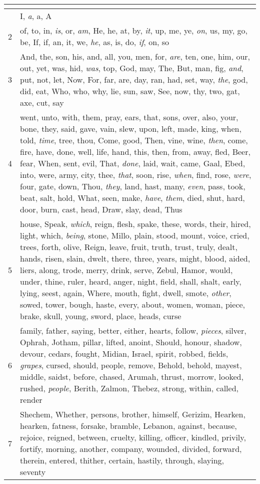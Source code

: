 \begin{center}
\begin{longtable}{l|p{3.75in}}
\hline \multicolumn{2}{c}{{ }} \\ \hline
\endfoot 
1 & I, \emph{a}, a, A\\ \hline 
2 & of, to, in, \emph{is}, or, \emph{am}, He, he, at, by, \emph{it}, up, me, ye, \emph{on}, us, my, go, be, If, if, an, it, we, \emph{he}, as, is, do, \emph{if}, on, so\\ \hline 
3 & And, the, son, his, and, all, you, men, for, \emph{are}, ten, one, him, our, out, yet, was, hid, \emph{was}, top, God, may, The, But, man, fig, \emph{and}, put, not, let, Now, For, far, are, day, ran, had, set, way, \emph{the}, god, did, eat, Who, who, why, lie, sun, saw, See, now, thy, two, gat, axe, cut, say\\ \hline 
4 & went, unto, with, them, pray, ears, that, sons, over, also, your, bone, they, said, gave, vain, slew, upon, left, made, king, when, told, \emph{time}, tree, thou, Come, good, Then, vine, wine, \emph{then}, come, fire, have, done, well, life, hand, this, then, from, away, fled, Beer, fear, When, sent, evil, That, \emph{done}, laid, wait, came, Gaal, Ebed, into, were, army, city, thee, \emph{that}, soon, rise, \emph{when}, find, rose, \emph{were}, four, gate, down, Thou, \emph{they}, land, hast, many, \emph{even}, pass, took, beat, salt, hold, What, seen, make, \emph{have}, \emph{them}, died, shut, hard, door, burn, cast, head, Draw, slay, dead, Thus\\ \hline 
5 & house, Speak, \emph{which}, reign, flesh, spake, these, words, their, hired, light, which, \emph{being}, stone, Millo, plain, stood, mount, voice, cried, trees, forth, olive, Reign, leave, fruit, truth, trust, truly, dealt, hands, risen, slain, dwelt, there, three, years, might, blood, aided, liers, along, trode, merry, drink, serve, Zebul, Hamor, would, under, thine, ruler, heard, anger, night, field, shall, shalt, early, lying, seest, again, Where, mouth, fight, dwell, smote, \emph{other}, sowed, tower, bough, haste, every, about, women, woman, piece, brake, skull, young, sword, place, heads, curse\\ \hline 
6 & family, father, saying, better, either, hearts, follow, \emph{pieces}, silver, Ophrah, Jotham, pillar, lifted, anoint, Should, honour, shadow, devour, cedars, fought, Midian, Israel, spirit, robbed, fields, \emph{grapes}, cursed, should, people, remove, Behold, behold, mayest, middle, saidst, before, chased, Arumah, thrust, morrow, looked, rushed, \emph{people}, Berith, Zalmon, Thebez, strong, within, called, render\\ \hline 
7 & Shechem, Whether, persons, brother, himself, Gerizim, Hearken, hearken, fatness, forsake, bramble, Lebanon, against, because, rejoice, reigned, between, cruelty, killing, officer, kindled, privily, fortify, morning, another, company, wounded, divided, forward, therein, entered, thither, certain, hastily, through, slaying, seventy\\ \hline 

\end{longtable}
\end{center}
